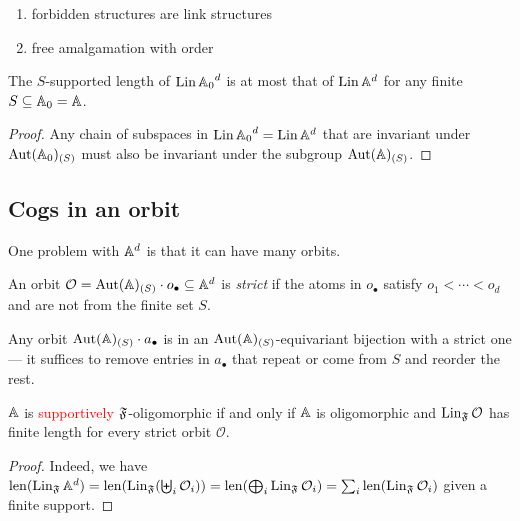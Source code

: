 \begin{lemma}
\color{blue}
    \begin{enumerate}
        \item 
        forbidden structures are link structures

        \item 
        free amalgamation with order
    \end{enumerate}
\end{lemma}

\begin{proposition}
    The $S$-supported length of $\operatorname{Lin} {\mathbb{A}_0}^d$ is at most that of $\operatorname{Lin} \mathbb{A}^d$ for any finite $S \subseteq \mathbb{A}_0 = \mathbb{A}$.
\end{proposition}
\begin{proof}
    Any chain of subspaces in $\operatorname{Lin} {\mathbb{A}_0}^d = \operatorname{Lin} \mathbb{A}^d$ that are invariant under $\operatorname{Aut}(\mathbb{A}_0)_{(S)}$ must also be invariant under the subgroup $\operatorname{Aut}(\mathbb{A})_{(S)}$.
\end{proof}


\subsection{Cogs in an orbit}
One problem with $\mathbb{A}^d$ is that it can have many orbits.
\begin{definition}\label{def:strict-orbit}
    An orbit $\mathcal{O} = \operatorname{Aut}(\mathbb{A})_{(S)} \cdot o_\bullet \subseteq \mathbb{A}^d$ is \emph{strict} 
    if the atoms in $o_\bullet$ satisfy $o_1 < \cdots < o_d$ and are not from the finite set $S$.
\end{definition}

Any orbit $\operatorname{Aut}(\mathbb{A})_{(S)} \cdot a_\bullet$ is in an $\operatorname{Aut}(\mathbb{A})_{(S)}$-equivariant bijection with a strict one
--- it suffices to remove entries in $a_\bullet$ that repeat or come from $S$ and reorder the rest.

\begin{proposition}
    $\mathbb{A}$ is \textcolor{red}{supportively} $\mathfrak{F}$-oligomorphic
    if and only if $\mathbb{A}$ is oligomorphic and $\operatorname{Lin}_{\mathfrak{F}} \mathcal{O}$ has finite length for every strict orbit $\mathcal{O}$.
\end{proposition}
\begin{proof}
    Indeed, we have \(
        \operatorname{len}(\operatorname{Lin}_{\mathfrak{F}} \mathbb{A}^d) 
        = \operatorname{len}(\operatorname{Lin}_{\mathfrak{F}}(\biguplus_i \mathcal{O}_i)) 
        = \operatorname{len}(\bigoplus_i \operatorname{Lin}_{\mathfrak{F}} \mathcal{O}_i)
        = \sum_i \operatorname{len}(\operatorname{Lin}_{\mathfrak{F}} \mathcal{O}_i)
    \)
    given a finite support.
\end{proof}

